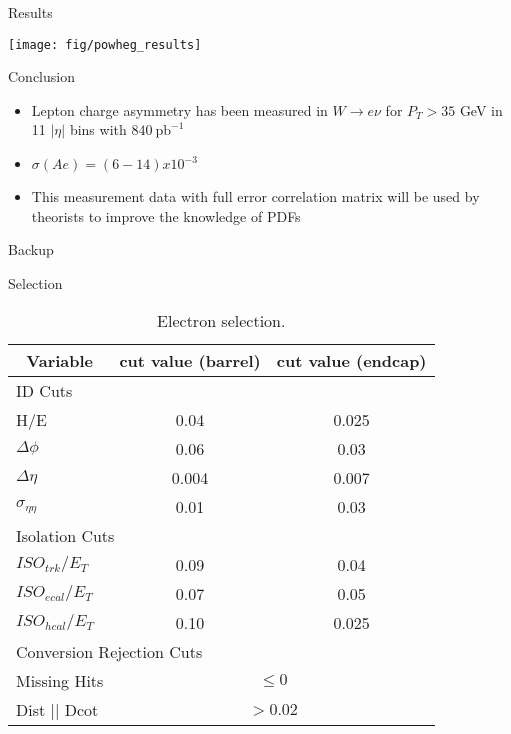 \documentclass[t, 8pt]{beamer}
\begin{document}
\begin{frame}{Results}
  \begin{center}
    \texttt{[image: fig/powheg\_results]}
  \end{center}
\end{frame}

\begin{frame}{Conclusion}
  \begin{itemize}
    \item Lepton charge asymmetry has been measured in $W\to e\nu$ for $P_T>35$
    GeV in 11 $|\eta|$ bins with $840\ \mathrm{pb}^{-1}$ 
    \item $\sigma(Ae) = (6-14) x 10^{-3}$
    \item This measurement data with full error correlation matrix will be used by theorists to
    improve the knowledge of PDFs

  \end{itemize}
\end{frame}


\begin{frame}{Backup}
\end{frame}

\begin{frame}{Selection}
\tiny{
\begin{center}
    \begin{table}[htbp]
    \begin{tabular}{|lcc|} \hline
      \multicolumn{1}{|c}{Variable} & \multicolumn{1}{c}{cut value (barrel)}& \multicolumn{1}{c|}{cut value (endcap)}\\
        \hline   \hline
       \multicolumn{3}{|l|}{ID Cuts}\\ \hline
        H/E & 0.04 & 0.025 \\
        $\Delta\phi$ & 0.06 & 0.03 \\
        $\Delta\eta$ & 0.004 & 0.007  \\
        $\sigma_{\eta\eta}$ & 0.01 & 0.03 \\ \hline
      \multicolumn{3}{|l|}{Isolation Cuts}\\ \hline
       $ISO_{trk} / E_T $  & 0.09 & 0.04 \\
       $ISO_{ecal}/ E_T$  & 0.07 & 0.05 \\
       $ISO_{hcal}/ E_T$  & 0.10 & 0.025 \\ \hline
      \multicolumn{3}{|l|}{Conversion Rejection Cuts}\\ \hline
       Missing Hits  & \multicolumn{2}{c|}{$\leq 0$}\\
       Dist $||$ Dcot   & \multicolumn{2}{c|}{$>0.02$}\\
      \hline
    \end{tabular}
    \caption{\label{tab:elecuts} Electron selection.}%
    \end{table}
\end{center}
    }
\end{frame}
\end{document}
